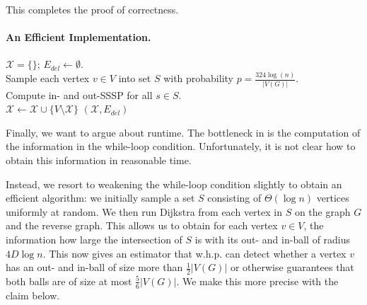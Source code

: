 This completes the proof of correctness.

\paragraph{An Efficient Implementation.}

\begin{algorithm}
$\mathcal{X} = \{\}$;  $E_{del} \gets \emptyset$.\\
{\color{red}Sample each vertex $v \in V$ into set $S$ with probability $p = \frac{324 \log(n)}{|V(G)|}$.}\\
{\color{red} Compute in- and out-SSSP for all $s \in S$.}\\
$\mathcal{X} \gets \mathcal{X} \cup \{ V \setminus \mathcal{X}\}$\label{lne:addCluster} 
\Return $(\mathcal{X} , E_{del} )$
\caption{$\textsc{ComputeDirectedLDD}(G, D)$}
\label{alg:directedLDDEff}
\end{algorithm}

Finally, we want to argue about runtime. The bottleneck in  is the computation of the information in the while-loop condition. Unfortunately, it is not clear how to obtain this information in reasonable time.

Instead, we resort to weakening the while-loop condition slightly to obtain an efficient algorithm: we initially sample a set $S$ consisting of $\Theta(\log n)$ vertices uniformly at random. We then run Dijkstra from each vertex in $S$ on the graph $G$ and the reverse graph. This allows us to obtain for each vertex $v \in V$, the information how large the intersection of $S$ is with its out- and in-ball of radius $4D\log n$. This now gives an estimator that w.h.p. can detect whether a vertex $v$ has an out- and in-ball of size more than $\frac{1}{2}|V(G)|$ or otherwise guarantees that both balls are of size at most $\frac{5}{6}|V(G)|$. We make this more precise with the claim below.

